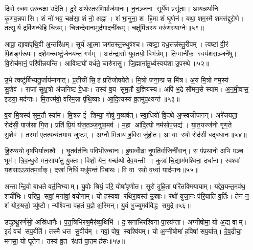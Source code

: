 दि॒वो रु॒क्म उ॑रु॒चक्षा॒ उदे॑ति।
दू॒रे अ॑र्थस्त॒रणि॒र्भ्राज॑मानः।
नू॒नञ्जना॒ सूर्ये॑ण॒ प्रसू॑ताः।
आयन्नर्था॑नि कृ॒णव॒न्नपासि।
शं नो॑ भव॒ चक्ष॑सा॒ शं नो॒ अह्ना।
शं भा॒नुना॒ श हि॒मा शं घृ॒णेन॑।
यथा॒ शम॒स्मै शमस॑द्दुरो॒णे।
तत्सूर्य॒ द्रवि॑णन्धे॒हि चि॒त्रम्।
चि॒त्रन्दे॒वाना॒मुद॑गा॒दनी॑कम्।
चक्षु॑र्मि॒त्रस्य॒ वरु॑णस्या॒ग्नेः॥५१॥

आप्रा॒ द्यावा॑पृथि॒वी अ॒न्तरि॑क्षम्।
सूर्य॑ आ॒त्मा जग॑तस्त॒स्थुष॑श्च।
त्वष्टा॒ दध॒त्तन्न॑स्तु॒रीपम्।
त्वष्टा॑ वी॒रं पि॒शङ्ग॑रूपः।
दशे॒मन्त्वष्टु॑र्जनयन्त॒ गर्भम्।
अत॑न्द्रासो युव॒तयो॒ बिभ॑र्त्रम्।
ति॒ग्मानी॑क॒ स्वय॑शस॒ञ्जने॑षु।
वि॒रोच॑मानं॒ परि॑षीन्नयन्ति।
आविष्ट्यो॑ वर्धते॒ चारु॑रासु।
जि॒ह्माना॑मू॒र्ध्वस्वय॑शा उ॒पस्थे॥५२॥

उ॒भे त्वष्टु॑र्बिभ्यतु॒र्जाय॑मानात्।
प्र॒तीची॑ सि॒हं प्रति॑जोषयेते।
मि॒त्रो जना॒न्प्र स मि॑त्र।
अ॒यं मि॒त्रो न॑म॒स्य॑ सु॒शेव॑।
राजा॑ सुक्ष॒त्रो अ॑जनिष्ट वे॒धाः।
तस्य॑ व॒य सु॑म॒तौ य॒ज्ञिय॑स्य।
अपि॑ भ॒द्रे सौ॑मन॒से स्या॑म।
अ॒न॒मी॒वास॒ इड॑या॒ मद॑न्तः।
मि॒तज्म॑वो॒ वरि॑म॒न्ना पृ॑थि॒व्याः।
आ॒दि॒त्यस्य॑ व्र॒तमु॑प॒क्ष्यन्त॑॥५३॥

व॒यं मि॒त्रस्य॑ सुम॒तौ स्या॑म।
मि॒त्रन्न ई शिम्या॒ गोषु॑ ग॒व्यव॑त्।
स्वा॒धियो॑ वि॒दथे॑ अ॒प्स्वजी॑जनन्।
अरे॑जयता॒ रोद॑सी॒ पाज॑सा गि॒रा।
प्रति॑ प्रि॒यं य॑ज॒तञ्ज॒नुषा॒मव॑।
म॒हा आ॑दि॒त्यो नम॑सोप॒सद्य॑।
या॒त॒यज्ज॑नो गृण॒ते सु॒शेव॑।
तस्मा॑ ए॒तत्पन्य॑तमाय॒ जुष्टम्।
अ॒ग्नौ मि॒त्राय॑ ह॒विरा जु॑होत।
आ वा॒ रथो॒ रोद॑सी बद्बधा॒नः॥५४॥

हि॒र॒ण्ययो॒ वृष॑भिर्या॒त्वश्वै।
घृ॒तव॑र्तनिः प॒विभी॑रुचा॒नः।
इ॒षाव्वोँ॒ढा नृ॒पति॑र्वा॒जिनी॑वान्।
स प॑प्रथा॒नो अ॒भि पञ्च॒ भूम॑।
त्रि॒व॒न्धु॒रो मन॒साया॑तु यु॒क्तः।
विशो॒ येन॒ गच्छ॑थो देव॒यन्ती।
कुत्रा॑ चि॒द्याम॑मश्विना॒ दधा॑ना।
स्वश्वा॑ य॒शसाऽऽया॑तम॒र्वाक्।
दस्रा॑ नि॒धिं मधु॑मन्तं पिबाथः।
वि वा॒ रथो॑ व॒ध्वा॑ याद॑मानः॥५५॥

अन्तान्दि॒वो बा॑धते वर्त॒निभ्याम्।
यु॒वोः श्रियं॒ परि॒ योषा॑वृणीत।
सूरो॑ दुहि॒ता परि॑तक्मियायाम्।
यद्दे॑व॒यन्त॒मव॑थ॒ शची॑भिः।
परि॑घ्र॒ सवां॒ मना॑वां॒ वयो॑गाम्।
यो ह॒स्यवा रथिरा॒वस्त॑ उ॒स्राः।
रथो॑ युजा॒नः प॑रि॒याति॑ व॒र्तिः।
तेन॑ न॒ शं योरु॒षसो॒ व्यु॑ष्टौ।
न्य॑श्विना वहतं य॒ज्ञे अ॒स्मिन्।
यु॒वं भु॒ज्युमव॑विद्ध समु॒द्रे॥५६॥

उदू॑हथु॒रर्ण॑सो॒ अस्रि॑धानैः।
प॒त॒त्रिभि॑रश्र॒मैर॑व्य॒थिभि॑।
द॒सना॑भिरश्विना पा॒रय॑न्ता।
अग्नी॑षोमा॒ यो अ॒द्य वाम्।
इ॒दं वच॑ सप॒र्यति॑।
तस्मै॑ धत्त सु॒वीर्यम्।
गवां॒ पोष॒ स्वश्वि॑यम्।
यो अ॒ग्नीषोमा॑ ह॒विषा॑ सप॒र्यात्।
दे॒व॒द्रीचा॒ मन॑सा॒ यो घृ॒तेन॑।
तस्य॑ व्र॒त र॑क्षतं पा॒तमह॑सः॥५७॥

